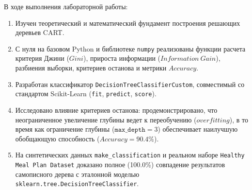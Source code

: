 \documentclass[14pt,a4paper]{extarticle}
\begin{document}
В ходе выполнения лабораторной работы:
\begin{enumerate}
    \item Изучен теоретический и математический фундамент построения решающих деревьев CART.
    \item С нуля на базовом Python и библиотеке \texttt{numpy} реализованы функции расчета критерия Джини ($Gini$), прироста информации ($Information\ Gain$), разбиения выборки, критериев останова и метрики $Accuracy$.
    \item Разработан классификатор \texttt{DecisionTreeClassifierCustom}, совместимый со стандартом Scikit-Learn (\texttt{fit}, \texttt{predict}, \texttt{score}).
    \item Исследовано влияние критериев останова: продемонстрировано, что неограниченное увеличение глубины ведет к переобучению ($overfitting$), в то время как ограничение глубины ($\texttt{max\_depth} = 3$) обеспечивает наилучшую обобщающую способность ($Accuracy = 90.4\%$).
    \item На синтетических данных \texttt{make\_classification} и реальном наборе \texttt{Healthy Meal Plan Dataset} доказано полное (100.0\%) совпадение результатов самописного дерева с эталонной моделью \texttt{sklearn.tree.DecisionTreeClassifier}.
\end{enumerate}
\end{document}
